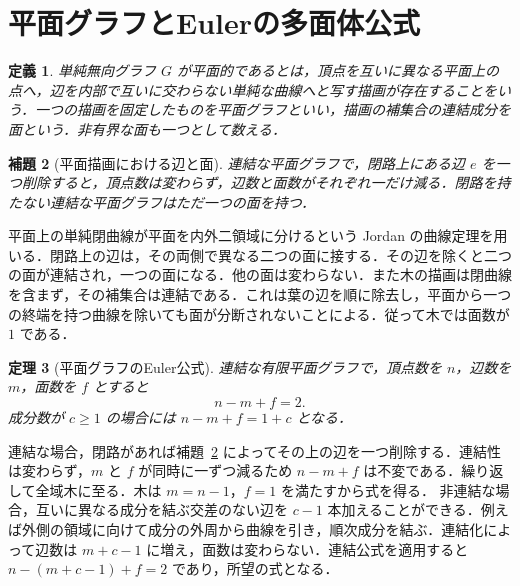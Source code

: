 \documentclass[a5paper,10pt,onecolumn]{jsarticle}
\makeatletter
\theoremstyle{mathnotetheorem}
\newtheorem{theorem}{定理}[section]
\newtheorem{definition}[theorem]{定義}
\newtheorem{lemma}[theorem]{補題}
\renewcommand{\proofname}{証明}
\renewenvironment{proof}[1][\proofname]{%
  \par\pushQED{\qed}\normalfont\topsep4\p@\@plus2\p@\relax
  \trivlist\item[\hskip\labelsep\bfseries #1]\ignorespaces
}{\popQED\endtrivlist\@endpefalse}
\makeatother
\begin{document}
\section{平面グラフとEulerの多面体公式}
\begin{definition}
単純無向グラフ $G$ が\emph{平面的}であるとは，頂点を互いに異なる平面上の点へ，辺を内部で互いに交わらない単純な曲線へと写す描画が存在することをいう．一つの描画を固定したものを\emph{平面グラフ}といい，描画の補集合の連結成分を\emph{面}という．非有界な面も一つとして数える．
\end{definition}

\begin{lemma}[平面描画における辺と面]\label{lem:faces}
連結な平面グラフで，閉路上にある辺 $e$ を一つ削除すると，頂点数は変わらず，辺数と面数がそれぞれ一だけ減る．閉路を持たない連結な平面グラフはただ一つの面を持つ．
\end{lemma}
\begin{proof}
平面上の単純閉曲線が平面を内外二領域に分けるという Jordan の曲線定理を用いる．閉路上の辺は，その両側で異なる二つの面に接する．その辺を除くと二つの面が連結され，一つの面になる．他の面は変わらない．また木の描画は閉曲線を含まず，その補集合は連結である．これは葉の辺を順に除去し，平面から一つの終端を持つ曲線を除いても面が分断されないことによる．従って木では面数が $1$ である．
\end{proof}

\begin{theorem}[平面グラフのEuler公式]\label{thm:planareuler}
連結な有限平面グラフで，頂点数を $n$，辺数を $m$，面数を $f$ とすると
\[
 n-m+f=2.
\]
成分数が $c\ge1$ の場合には $n-m+f=1+c$ となる．
\end{theorem}
\begin{proof}
連結な場合，閉路があれば補題~\ref{lem:faces} によってその上の辺を一つ削除する．連結性は変わらず，$m$ と $f$ が同時に一ずつ減るため $n-m+f$ は不変である．繰り返して全域木に至る．木は $m=n-1$，$f=1$ を満たすから式を得る．
非連結な場合，互いに異なる成分を結ぶ交差のない辺を $c-1$ 本加えることができる．例えば外側の領域に向けて成分の外周から曲線を引き，順次成分を結ぶ．連結化によって辺数は $m+c-1$ に増え，面数は変わらない．連結公式を適用すると $n-(m+c-1)+f=2$ であり，所望の式となる．
\end{proof}
\end{document}
